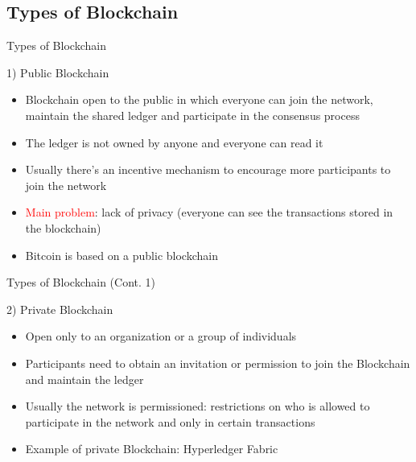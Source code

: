 \documentclass{beamer}
\newcommand\red[1]{\textcolor{red}{#1}}
\begin{document}
  \subsection{Types of Blockchain}
  \begin{frame}{Types of Blockchain}
    \begin{block}{1) Public Blockchain}
      \begin{itemize}
        \item Blockchain open to the public in which everyone can join the network,
        maintain the shared ledger and participate in the consensus process 
        \item The ledger is not owned by anyone and everyone can read it 
        \item Usually there's an incentive mechanism to encourage more participants
        to join the network \pause
        \item \red{Main problem}: lack of privacy (everyone can see the transactions
        stored in the blockchain) \pause
        \item Bitcoin is based on a public blockchain
      \end{itemize}
    \end{block}
  \end{frame}




  \begin{frame}{Types of Blockchain (Cont. 1)}
    \begin{block}{2) Private Blockchain}
      \begin{itemize}
        \item Open only to an organization or a group of individuals
        \item Participants need to obtain an invitation or permission to join the Blockchain and maintain the ledger
        \item Usually the network is permissioned: restrictions on who is allowed to participate in the network and only in certain transactions 
        \item Example of private Blockchain: Hyperledger Fabric \cite{hyperledger-fabric}
      \end{itemize}
    \end{block}
  \end{frame}
\end{document}
